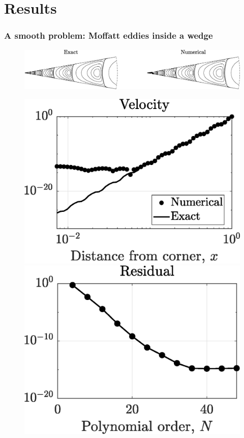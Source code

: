 
\section{Results}

\begin{frame}
\frametitle{A smooth problem: Moffatt eddies inside a wedge}
\centering
\begin{figure}
	\includegraphics[width=\linewidth]{Figures/moff_psi}
	
	\vfill
	\includegraphics[height=0.3\linewidth]{Figures/moff_vel}
	\hfill
	\includegraphics[height=0.3\linewidth]{Figures/moff_res}
\end{figure}

\end{frame}


